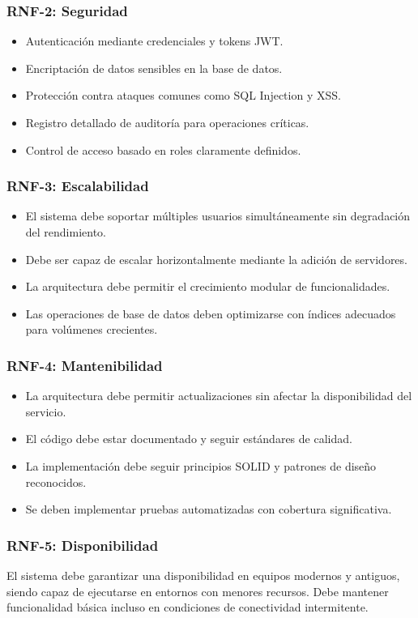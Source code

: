 \documentclass[12pt]{article}
\begin{document}
\subsubsection{RNF-2: Seguridad}
\begin{itemize}
  \item Autenticación mediante credenciales y tokens JWT.
  \item Encriptación de datos sensibles en la base de datos.
  \item Protección contra ataques comunes como SQL Injection y XSS.
  \item Registro detallado de auditoría para operaciones críticas.
  \item Control de acceso basado en roles claramente definidos.
\end{itemize}

\subsubsection{RNF-3: Escalabilidad}
\begin{itemize}
  \item El sistema debe soportar múltiples usuarios simultáneamente sin degradación del rendimiento.
  \item Debe ser capaz de escalar horizontalmente mediante la adición de servidores.
  \item La arquitectura debe permitir el crecimiento modular de funcionalidades.
  \item Las operaciones de base de datos deben optimizarse con índices adecuados para volúmenes crecientes.
\end{itemize}

\subsubsection{RNF-4: Mantenibilidad}
\begin{itemize}
  \item La arquitectura debe permitir actualizaciones sin afectar la disponibilidad del servicio.
  \item El código debe estar documentado y seguir estándares de calidad.
  \item La implementación debe seguir principios SOLID y patrones de diseño reconocidos.
  \item Se deben implementar pruebas automatizadas con cobertura significativa.
\end{itemize}

\subsubsection{RNF-5: Disponibilidad}
El sistema debe garantizar una disponibilidad en equipos modernos y antiguos, siendo capaz de ejecutarse en entornos con menores recursos. Debe mantener funcionalidad básica incluso en condiciones de conectividad intermitente.
\end{document}
